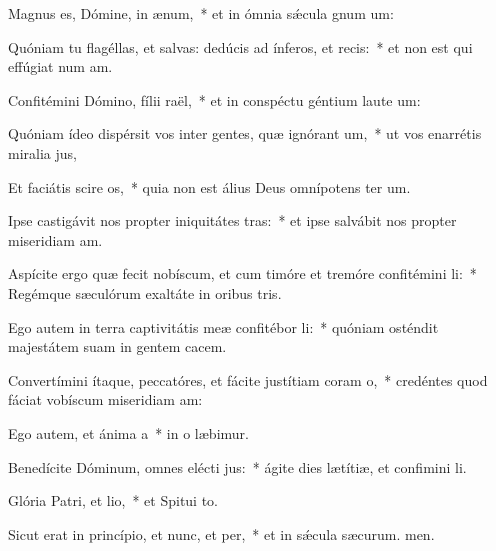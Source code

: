\item Magnus es, Dómine, in ænum,~* et in ómnia sǽcula gnum um:
\item Quóniam tu flagéllas, et salvas: dedúcis ad ínferos, et recis:~* et non est qui effúgiat num am.
\item Confitémini Dómino, fílii raël,~* et in conspéctu géntium laute um:
\item Quóniam ídeo dispérsit vos inter gentes, quæ ignórant um,~* ut vos enarrétis miralia jus,
\item Et faciátis scire os,~* quia non est álius Deus omnípotens ter um.
\item Ipse castigávit nos propter iniquitátes tras:~* et ipse salvábit nos propter miseridiam am.
\item Aspícite ergo quæ fecit nobíscum, et cum timóre et tremóre confitémini li:~* Regémque sæculórum exaltáte in oribus tris.
\item Ego autem in terra captivitátis meæ confitébor li:~* quóniam osténdit majestátem suam in gentem cacem.
\item Convertímini ítaque, peccatóres, et fácite justítiam coram o,~* credéntes quod fáciat vobíscum miseridiam am:
\item Ego autem, et ánima a~* in o læbimur.
\item Benedícite Dóminum, omnes elécti jus:~* ágite dies lætítiæ, et confimini li.
\item Glória Patri, et lio,~* et Spitui to.
\item Sicut erat in princípio, et nunc, et per,~* et in sǽcula sæcurum. men.
